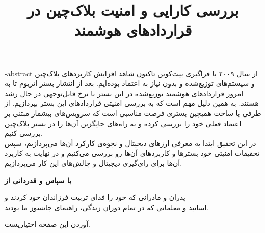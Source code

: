 \documentclass[oneside,openany,mscS]{SBU-Thesis}
\begin{document}
	\title{بررسی کارایی و امنیت بلاک‌چین در قرار‌داد‌های هوشمند}
	
	\subject{مهندسی کامپیوتر}
	
	
	
	
	


	
	
	
	\fa-abstract{	
		از سال ۲۰۰۹ با فراگیری بیت‌‌کوین تاکنون شاهد افزایش ‌کاربرد‌های بلاک‌چین و سیستم‌های توزیع‌شده و بدون نیاز به اعتماد بوده‌ایم. بعد از انتشار بستر اتریوم تا به امروز قرار‌داد‌های هوشمند توزیع‌شده در این بستر با نر‌خ قابل‌توجهی در حال‌ رشد هستند. به همین دلیل مهم است که به بررسی امنیتی قرار‌داد‌های این بستر بپردازیم. از طرفی با ساخت همیچین بستری فرصت مناسبی است که سرویس‌های بیشمار مبتنی بر اعتماد فعلی خود را بررسی کرده و به راه‌های جایگزین آن‌ها را در بستر بلاک‌چین بررسی کنیم.
		\\
		در این تحقیق ابتدا به معرفی ارز‌های دیجیتال و نجوه‌ی کارکرد آن‌ها می‌پردازیم، سپس تحقیقات امنیتی خود بسترها و کاربرد‌های آن‌ها رو بررسی می‌کنیم و در نهایت به کاربرد آن‌ها برای رای‌گیری دیجیتال و چالش‌های این کار می‌پردازیم. 
	}
	
\firstPage %
\davaranPage %

{
	\newpage
	\thispagestyle{plain}
	\noindent
	\large{\textbf{با سپاس و قدردانی از}}
	
	\noindent
	پدران و مادرانی که خود را فدای تربیت فرزاندان خود کردند و\\
	اساتید و معلمانی که در تمام دوران زندگی، راهنمای جانسوز ما بودند.
	
	
	\vspace{14cm}	
	آوردن این صفحه اختیاریست.
	
	\pagebreak
}
\end{document}
